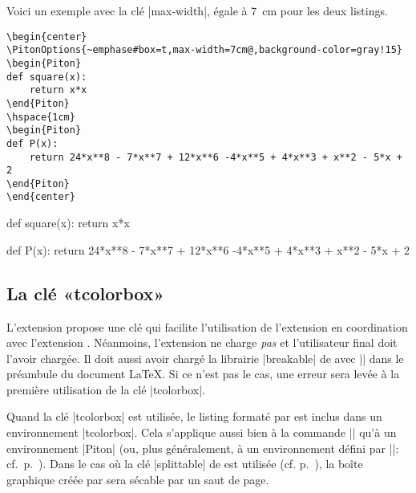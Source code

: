 \documentclass[dvipsnames,svgnames]{article}
\begin{document}
\vspace{1cm}
Voici un exemple avec la clé |max-width|, égale à 7~cm pour les deux listings.

\begin{Verbatim}
\begin{center}
\PitonOptions{~emphase#box=t,max-width=7cm@,background-color=gray!15}
\begin{Piton}
def square(x):
    return x*x
\end{Piton}
\hspace{1cm}
\begin{Piton}
def P(x):
    return 24*x**8 - 7*x**7 + 12*x**6 -4*x**5 + 4*x**3 + x**2 - 5*x + 2
\end{Piton}
\end{center}
\end{Verbatim}

\begin{center}
\begin{Piton}
def square(x):
    return x*x
\end{Piton}
\hspace{1cm}
\begin{Piton}
def P(x):
    return 24*x**8 - 7*x**7 + 12*x**6 -4*x**5 + 4*x**3 + x**2 - 5*x + 2
\end{Piton}
\end{center}


\subsection{La clé «tcolorbox»}

\label{tcolorbox}

L'extension  propose une clé  qui facilite
l'utilisation de l'extension  en coordination avec l'extension
. Néanmoins, l'extension  ne charge \emph{pas} 
et l'utilisateur final doit l'avoir chargée. Il doit aussi avoir chargé la
librairie |breakable| de  avec || dans le
préambule du document LaTeX. Si ce n'est pas le cas, une erreur sera levée à la première
utilisation de la clé |tcolorbox|.


\bigskip
Quand la clé |tcolorbox| est utilisée, le listing formaté par  est
inclus dans un environnement |{tcolorbox}|. Cela s'applique aussi bien à la
commande |\PitonInputFile| qu'à un environnement |{Piton}| (ou, plus
généralement, à un environnement défini par |\NewPitonEnvironment|:
cf.~p.~\pageref{NewPitonEnvironment}). Dans le cas où la clé |splittable| de
 est utilisée (cf. p.~\pageref{coupure-de-pages}), la boîte graphique
créée par  sera sécable par un saut de page.
\end{document}
